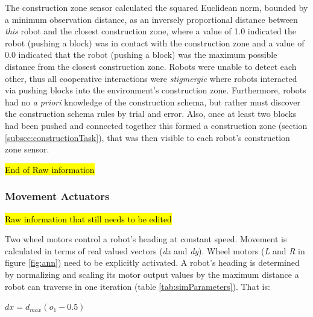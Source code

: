 \documentclass[conference]{IEEEtran}
\begin{document}
The construction zone sensor calculated the squared Euclidean norm, bounded by a minimum observation distance, as an
inversely proportional distance between \textit{this} robot and the closest construction zone, where a value of 1.0 indicated the robot (pushing a block)
was in contact with the construction zone and a value of 0.0 indicated that the robot (pushing a block) was the maximum possible
distance from the closest construction zone.
Robots were unable to detect each other, thus all cooperative interactions were \textit{stigmergic} \cite{BeckersHollandDeneubourg1994}
where robots interacted via pushing blocks into the environment's construction zone.
Furthermore, robots had no \textit{a priori} knowledge of the construction schema,
but rather must discover the construction schema rules by trial and error.
Also, once at least two blocks had been pushed and connected together this formed a construction zone (section \ref{subsec:constructionTask}),
that was then visible to each robot's construction zone sensor.

\hl{End of Raw information}

\subsubsection{Movement Actuators}
\hl{Raw information that still needs to be edited}

Two wheel motors control a robot's heading at constant speed.
Movement is calculated in terms of real valued vectors (\textit{dx}
and \textit{dy}).  Wheel motors (\textit{L} and \textit{R} in figure \ref{fig:ann})
need to be explicitly activated.
A robot's heading is determined by normalizing and scaling its motor
output values by the maximum distance a robot can traverse in one
iteration (table \ref{tab:simParameters}).  That is:

$\textit{dx} = d_{max} (o_{1} - 0.5)$
\end{document}
